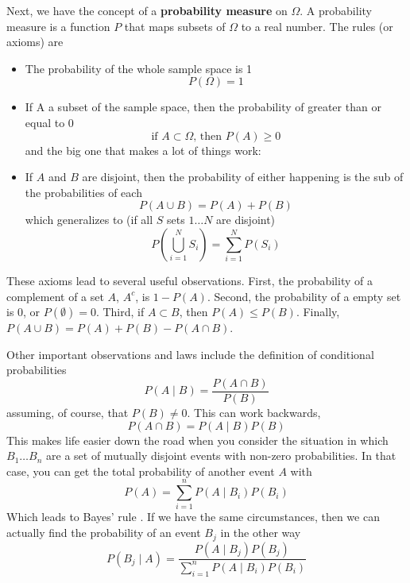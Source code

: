 Next, we have the concept of a {\bf probability measure} on $\Omega$. A probability measure is a function $P$ that maps subsets of $\Omega$ to a real number. The rules (or axioms) are
\begin{itemize}
\item{The probability of the whole sample space is 1}
\begin{equation}
P\left(\Omega\right) = 1
\end{equation}
\item{If A a subset of the sample space, then the probability of greater than or equal to 0}
\begin{equation}
\mbox{if } A \subset \Omega \mbox{, then } P\left(A\right) \ge 0
\end{equation}
and the big one that makes a lot of things work:
\item{If $A$ and $B$ are disjoint, then the probability of either happening is the sub of the probabilities of each}
\begin{equation}
P\left(A \cup B\right) = P\left(A\right) + P\left(B\right)
\end{equation}
which generalizes to (if all $S$ sets $1\ldots N$ are disjoint)
\begin{equation}
P\left(\bigcup_{i=1}^N S_i\right)= \sum_{i=1}^N P\left(S_i\right)
\end{equation}
\end{itemize}

These axioms lead to several useful observations. First, the probability of a complement of a set $A$, $A^c$, is $1-P\left(A\right)$. Second, the probability of a empty set is 0, or $P\left(\emptyset\right) = 0$. Third, if $A \subset B$, then $P\left(A\right) \le P\left(B\right)$. Finally, $P\left(A \cup B\right) = P\left(A\right) + P\left(B\right) - P\left(A\cap B\right)$.

Other important observations and laws include the definition of conditional probabilities
\begin{equation}
P\left(A\mid B\right) = \frac{P\left(A\cap B\right)}{P\left(B\right)}
\end{equation}
assuming, of course, that $P\left(B\right) \neq 0$. This can work backwards,
\begin{equation}
P\left(A\cap B\right) = P\left(A\mid B\right)P\left(B\right)
\end{equation}
This makes life easier down the road when you consider the situation in which $B_1\ldots B_n$ are a set of mutually disjoint events with non-zero probabilities. In that case, you can get the total probability of another event $A$ with
\begin{equation}
P\left(A\right) = \sum_{i=1}^n P\left(A \mid B_i \right)P\left(B_i\right)
\end{equation}
Which leads to Bayes' rule \citep{rice2007mathematical}. If we have the same circumstances, then we can actually find the probability of an event $B_j$ in the other way
\begin{equation}\label{eq:bayes}
P\left(B_j \mid A\right) = \frac{P\left(A\mid B_j\right)P\left(B_j\right)}{\sum_{i=1}^n P\left(A \mid B_i \right)P\left(B_i\right)}
\end{equation}

